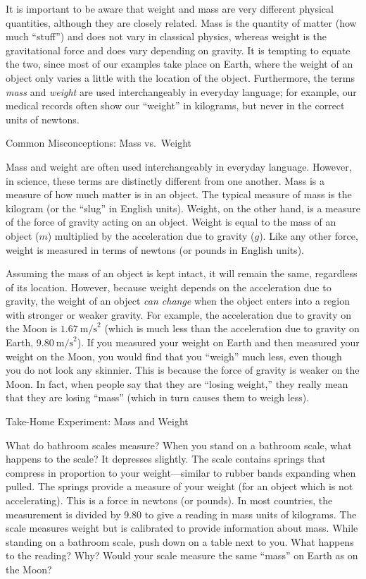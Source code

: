 \documentclass[
]{book}
\begin{document}
It is important to be aware that weight and mass are very different
physical quantities, although they are closely related. Mass is the
quantity of matter (how much ``stuff'') and does not vary in classical
physics, whereas weight is the gravitational force and does vary
depending on gravity. It is tempting to equate the two, since most of
our examples take place on Earth, where the weight of an object only
varies a little with the location of the object. Furthermore, the terms
\emph{mass} and \emph{weight} are used interchangeably in everyday language; for
example, our medical records often show our ``weight'' in kilograms, but
never in the correct units of newtons.

\hypertarget{fs-id1570965}{}
Common Misconceptions: Mass vs.~Weight

Mass and weight are often used interchangeably in everyday language.
However, in science, these terms are distinctly different from one
another. Mass is a measure of how much matter is in an object. The
typical measure of mass is the kilogram (or the ``slug'' in English
units). Weight, on the other hand, is a measure of the force of gravity
acting on an object. Weight is equal to the mass of an object (\(m{}\))
multiplied by the acceleration due to gravity (\(g{}\)). Like any other
force, weight is measured in terms of newtons (or pounds in English
units).

Assuming the mass of an object is kept intact, it will remain the same,
regardless of its location. However, because weight depends on the
acceleration due to gravity, the weight of an object \emph{can change} when
the object enters into a region with stronger or weaker gravity. For
example, the acceleration due to gravity on the Moon is
\({1.67\ \text{m/s}^{2}}{}\) (which is much less than the acceleration due
to gravity on Earth, \({9.80\ \text{m/s}^{2}}{}\)). If you measured your
weight on Earth and then measured your weight on the Moon, you would
find that you ``weigh'' much less, even though you do not look any
skinnier. This is because the force of gravity is weaker on the Moon. In
fact, when people say that they are ``losing weight,'' they really mean
that they are losing ``mass'' (which in turn causes them to weigh less).

\hypertarget{fs-id3245519}{}
Take-Home Experiment: Mass and Weight

What do bathroom scales measure? When you stand on a bathroom scale,
what happens to the scale? It depresses slightly. The scale contains
springs that compress in proportion to your weight---similar to rubber
bands expanding when pulled. The springs provide a measure of your
weight (for an object which is not accelerating). This is a force in
newtons (or pounds). In most countries, the measurement is divided by
9.80 to give a reading in mass units of kilograms. The scale measures
weight but is calibrated to provide information about mass. While
standing on a bathroom scale, push down on a table next to you. What
happens to the reading? Why? Would your scale measure the same ``mass'' on
Earth as on the Moon?
\end{document}

